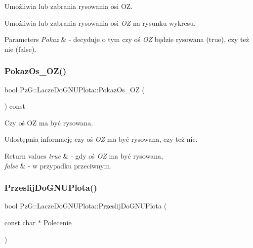 Umożliwia lub zabrania rysowania osi OZ. 

Umożliwia lub zabrania rysowania osi {\itshape OZ} na rysunku wykresu. 
\begin{DoxyParams}{Parameters}
{\em Pokaz} & -\/ decyduje o tym czy oś {\itshape OZ} będzie rysowana ({\ttfamily true}), czy też nie ({\ttfamily false}). \\
\hline
\end{DoxyParams}
\mbox{\label{classPzG_1_1LaczeDoGNUPlota_a22c708af33c57bf3b5d1b4e82b4017b7}} 
\subsubsection{\texorpdfstring{Pokaz\+Os\+\_\+\+O\+Z()}{PokazOs\_OZ()}\hspace{0.1cm}{\footnotesize\ttfamily [2/2]}}
{\footnotesize\ttfamily bool Pz\+G\+::\+Lacze\+Do\+G\+N\+U\+Plota\+::\+Pokaz\+Os\+\_\+\+OZ (\begin{DoxyParamCaption}{ }\end{DoxyParamCaption}) const\hspace{0.3cm}{\ttfamily [inline]}}



Czy oś OZ ma być rysowana. 

Udostępnia informację czy oś {\itshape OZ} ma być rysowana, czy też nie. 
\begin{DoxyRetVals}{Return values}
{\em true} & -\/ gdy oś {\itshape OZ} ma być rysowana, \\
\hline
{\em false} & -\/ w przypadku przeciwnym. \\
\hline
\end{DoxyRetVals}
\mbox{\label{classPzG_1_1LaczeDoGNUPlota_a5063854b7232a7951d120a21df63f2b7}} 
\subsubsection{\texorpdfstring{Przeslij\+Do\+G\+N\+U\+Plota()}{PrzeslijDoGNUPlota()}}
{\footnotesize\ttfamily bool Pz\+G\+::\+Lacze\+Do\+G\+N\+U\+Plota\+::\+Przeslij\+Do\+G\+N\+U\+Plota (\begin{DoxyParamCaption}\item[{const char $\ast$}]{Polecenie }\end{DoxyParamCaption})\hspace{0.3cm}{\ttfamily [protected]}}

